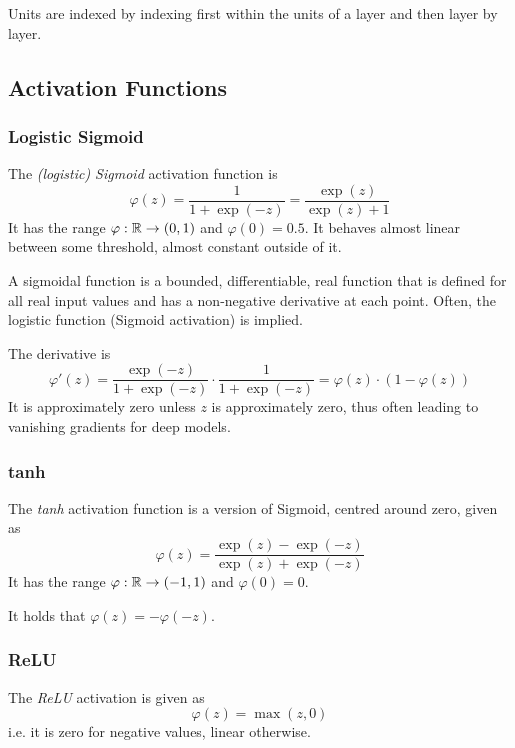 Units are indexed by indexing first within the units of a layer
and then layer by layer.


\subsection{Activation Functions}
\subsubsection{Logistic Sigmoid}
The \emph{(logistic) Sigmoid} activation function is
\begin{equation*}
\varphi(z) = \frac{1}{1 + \exp{(-z)}}
= \frac{\exp{(z)}}{\exp{(z)} + 1}
\end{equation*}
It has the range $\varphi : \mathbb{R} \to (0, 1)$
and $\varphi(0) = 0.5$.
It behaves almost linear between some threshold,
almost constant outside of it.

A sigmoidal function is a bounded, differentiable, real function
that is defined for all real input values and has a non-negative
derivative at each point.
Often, the logistic function (Sigmoid activation) is implied.

The derivative is
\begin{equation*}
\varphi'(z)
= \frac{\exp{(-z)}}{1 + \exp{(-z)}} \cdot \frac{1}{1 + \exp{(-z)}}
= \varphi(z) \cdot (1 - \varphi(z))
\end{equation*}
It is approximately zero unless $z$ is approximately zero,
thus often leading to vanishing gradients for deep models.

\subsubsection{tanh}
The \emph{tanh} activation function is a version of Sigmoid, 
centred around zero, given as
\begin{equation*}
\varphi(z)
= \frac{\exp{(z)} - \exp{(-z)}}{\exp{(z)} + \exp{(-z)}}
\end{equation*}
It has the range $\varphi : \mathbb{R} \to (-1, 1)$
and $\varphi(0) = 0$.

It holds that $\varphi(z) = - \varphi(-z)$.

\subsubsection{ReLU}
The \emph{ReLU} activation is given as
\begin{equation*}
\varphi(z) = \max(z, 0)
\end{equation*}
i.e. it is zero for negative values, linear otherwise.

